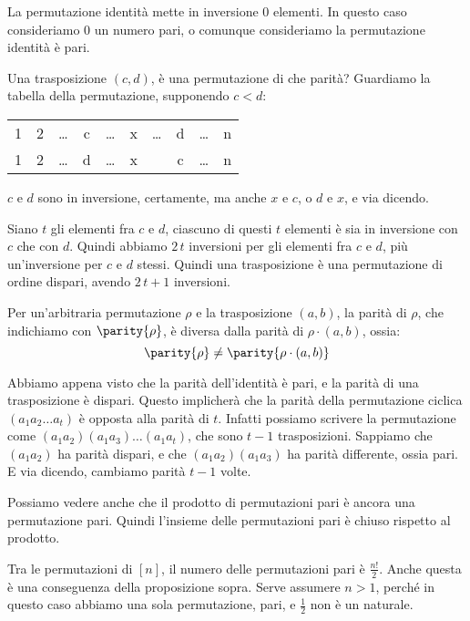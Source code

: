 La permutazione identit\`a mette in inversione 0 elementi.
In questo caso consideriamo 0 un numero pari, o comunque consideriamo la permutazione identit\`a \`e pari.

Una trasposizione $(c,d)$, \`e una permutazione di che parit\`a?
Guardiamo la tabella della permutazione, supponendo $c < d$:

\begin{tabular}{*{10}{c}}
	1 & 2 & \dots & c & \dots & x & \dots & d & \dots & n \\
	1 & 2 & \dots & d & \dots & x &  & c & \dots & n
\end{tabular}

$c$ e $d$ sono in inversione, certamente, ma anche $x$ e $c$, o $d$ e $x$, e via dicendo.

Siano $t$ gli elementi fra $c$ e $d$, ciascuno di questi $t$ elementi \`e sia in inversione con $c$ che con $d$.
Quindi abbiamo $2 \, t$ inversioni per gli elementi fra $c$ e $d$, pi\`u un'inversione per $c$ e $d$ stessi.
Quindi una trasposizione \`e una permutazione di ordine dispari, avendo $2 \, t + 1$ inversioni.

\begin{prop}
	Per un'arbitraria permutazione $\rho$ e la trasposizione $(a,b)$, la parit\`a di $\rho$, che indichiamo con $\parity{\rho}$, \`e diversa dalla parit\`a di $\rho \cdot (a,b)$, ossia:
	\[
		\parity{\rho} \neq \parity{\rho \cdot (a,b)}
	\]
\end{prop}
Abbiamo appena visto che la parit\`a dell'identit\`a \`e pari, e la parit\`a di una trasposizione \`e dispari.
Questo implicher\`a che la parit\`a della permutazione ciclica $(a_1 a_2 \dots a_t)$ \`e opposta alla parit\`a di $t$.
Infatti possiamo scrivere la permutazione come $(a_1 a_2) (a_1 a_3) \dots (a_1 a_t)$, che sono $t-1$ trasposizioni.
Sappiamo che $(a_1 a_2)$ ha parit\`a dispari, e che $(a_1 a_2) (a_1 a_3)$ ha parit\`a differente, ossia pari.
E via dicendo, cambiamo parit\`a $t-1$ volte.

Possiamo vedere anche che il prodotto di permutazioni pari \`e ancora una permutazione pari.
Quindi l'insieme delle permutazioni pari \`e chiuso rispetto al prodotto.

Tra le permutazioni di $[n]$, il numero delle permutazioni pari \`e $\frac{n!}{2}$.
Anche questa \`e una conseguenza della proposizione sopra.
Serve assumere $n > 1$, perch\'e in questo caso abbiamo una sola permutazione, pari, e $\frac{1}{2}$ non \`e un naturale.

